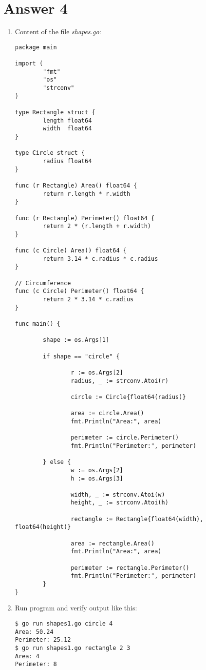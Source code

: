 \documentclass[11pt,a4paper]{article}
\begin{document}
\section*{Answer 4}
\begin{enumerate}
\item Content of the file {\it shapes.go}:
\begin{verbatim}
package main

import (
        "fmt"
        "os"
        "strconv"
)

type Rectangle struct {
        length float64
        width  float64
}

type Circle struct {
        radius float64
}

func (r Rectangle) Area() float64 {
        return r.length * r.width
}

func (r Rectangle) Perimeter() float64 {
        return 2 * (r.length + r.width)
}

func (c Circle) Area() float64 {
        return 3.14 * c.radius * c.radius
}

// Circumference
func (c Circle) Perimeter() float64 {
        return 2 * 3.14 * c.radius
}

func main() {

        shape := os.Args[1]

        if shape == "circle" {

                r := os.Args[2]
                radius, _ := strconv.Atoi(r)

                circle := Circle{float64(radius)}

                area := circle.Area()
                fmt.Println("Area:", area)

                perimeter := circle.Perimeter()
                fmt.Println("Perimeter:", perimeter)

        } else {
                w := os.Args[2]
                h := os.Args[3]

                width, _ := strconv.Atoi(w)
                height, _ := strconv.Atoi(h)

                rectangle := Rectangle{float64(width), float64(height)}

                area := rectangle.Area()
                fmt.Println("Area:", area)

                perimeter := rectangle.Perimeter()
                fmt.Println("Perimeter:", perimeter)
        }
}
\end{verbatim}

\item Run program and verify output like this:
\begin{verbatim}
$ go run shapes1.go circle 4
Area: 50.24
Perimeter: 25.12
$ go run shapes1.go rectangle 2 3
Area: 4
Perimeter: 8
\end{verbatim}

\end{enumerate}
\end{document}
